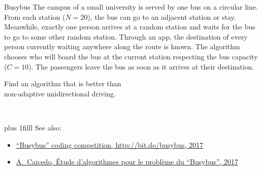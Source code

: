 \documentclass[onepage, 12pt]{beamer}
\def\Bottom#1{\vskip 0pt plus 1filll #1}
\begin{document}
\begin{frame}[t]{Busybus}{}
    The campus of a small university
    is served by one bus on a circular line.
    From each station ($N = 20$), the bus can go to an adjacent station or stay.
    Meanwhile, exactly one person arrives at a random station
    and waits for the bus to go to some other random station.
    Through an app, the destination of every person currently waiting
    anywhere along the route is known.
    The algorithm chooses who will board the bus at the current station
    respecting the bus capacity ($C = 10$).
    The passengers leave the bus as soon as it arrives at their destination.
    
    \begin{minipage}{0.7\textwidth}
        Find an algorithm that is better than \\
        non-adaptive unidirectional driving.
    \end{minipage}
    \begin{minipage}{0.29\textwidth}
        {\ }
        \centering
    \end{minipage}

    \Bottom{%
        \footnotesize
        See also:
        \begin{itemize}
        \item 
            \href{http://bit.do/busybus}{%
                ``Busybus'' coding competition, http://bit.do/busybus, 2017
            }
        \item
            \href{http://bit.do/ac-rep}{%
                A.~Caicedo, \'Etude d'algorithmes pour le probl\`eme du ``Busybus'', 2017
            }
        \end{itemize}
    }
\end{frame}
\end{document}
